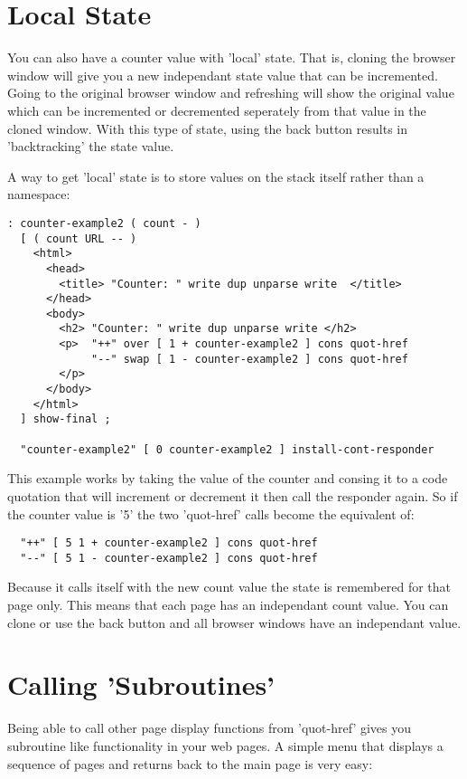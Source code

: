 \section{Local State}

You can also have a counter value with 'local' state. That is, cloning
the browser window will give you a new independant state value that
can be incremented. Going to the original browser window and
refreshing will show the original value which can be incremented or
decremented seperately from that value in the cloned window. With this
type of state, using the back button results in 'backtracking' the
state value.

A way to get 'local' state is to store values on the stack itself
rather than a namespace:

\begin{verbatim}
: counter-example2 ( count - )
  [ ( count URL -- )
    <html>
      <head> 
        <title> "Counter: " write dup unparse write  </title>
      </head>
      <body>
        <h2> "Counter: " write dup unparse write </h2> 
        <p>  "++" over [ 1 + counter-example2 ] cons quot-href
             "--" swap [ 1 - counter-example2 ] cons quot-href
        </p>
      </body>
    </html>
  ] show-final ;

  "counter-example2" [ 0 counter-example2 ] install-cont-responder
\end{verbatim}

This example works by taking the value of the counter and consing it
to a code quotation that will increment or decrement it then call the
responder again. So if the counter value is '5' the two 'quot-href'
calls become the equivalent of:

\begin{verbatim}
  "++" [ 5 1 + counter-example2 ] cons quot-href
  "--" [ 5 1 - counter-example2 ] cons quot-href
\end{verbatim}

Because it calls itself with the new count value the state is
remembered for that page only. This means that each page has an
independant count value. You can clone or use the back button and all
browser windows have an independant value.

\section{Calling 'Subroutines'}

Being able to call other page display functions from 'quot-href' gives
you subroutine like functionality in your web pages. A simple menu
that displays a sequence of pages and returns back to the main page is
very easy:

